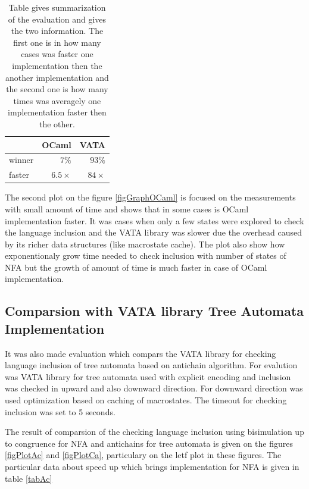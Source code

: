 \begin{center}
\begin{table}
\begin{center}
  \begin{tabular}{ | l | r | r |}
   \hline
    & \textbf{OCaml} & \textbf{VATA} \\ \hline \hline
    winner & $7\%$ & $93\%$ \\ \hline
    faster & $6.5\times$ & $84\times$ \\ \hline
   \end{tabular}
   \caption{Table gives summarization of the evaluation and gives the two information. The first one is
     in how many cases was faster one implementation then the another implementation 
   and the second one is how many times was averagely one implementation faster then the other.}
   \label{tabOcaml}
\end{center}
\end{table}
\end{center}

The second plot on the figure \ref{figGraphOCaml} is focused on the measurements with small amount of time and 
shows that in some cases is OCaml implementation faster. It was cases when only a few states were explored to 
check the language inclusion and the VATA library was slower due the overhead caused by its richer data structures (like macrostate cache). The plot also show
how exponentionaly grow time needed to check inclusion with number of states of NFA but 
the growth of amount of time is much faster in case of OCaml implementation.

\subsection{Comparsion with VATA library Tree Automata Implementation}
It was also made evaluation which compars the VATA library for checking language inclusion of tree automata based on antichain algorithm. For evalution was 
VATA library for tree automata used with explicit encoding and inclusion was checked in upward and also downward direction. For downward direction was used
optimization based on caching of macrostates. The timeout for checking inclusion was set to 5 seconds.

The result of comparsion of the checking language inclusion using bisimulation up to congruence for NFA and antichains for tree automata 
is given on the figures \ref{figPlotAc} and \ref{figPlotCa}, particulary on the letf plot in these figures.
The particular data about speed up which brings implementation for NFA is given in table \ref{tabAc}

